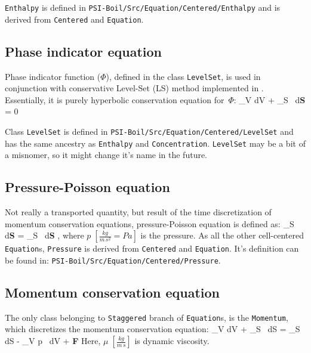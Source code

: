 {\tt Enthalpy} is defined in {\tt PSI-Boil/Src/Equation/Centered/Enthalpy}
and is derived from {\tt Centered} and {\tt Equation}.

\subsection{Phase indicator equation}

Phase indicator function ($\Phi$), defined in the class {\tt LevelSet}, is used
in conjunction with conservative Level-Set (LS) method implemented in
{\psiboil}. Essentially, it is purely hyperbolic conservation equation for~$\Phi$:
%
\be
         \int_V  dV
       + \int_S \uvw \Phi \, d{\bf S}
       = 
       0
       \; \; \; \;
       [\frac{m^3}{s}]
\ee

Class {\tt LevelSet} is defined in {\tt PSI-Boil/Src/Equation/Centered/LevelSet}
and has the same ancestry as {\tt Enthalpy} and {\tt Concentration}. {\tt LevelSet}
may be a bit of a misnomer, so it might change it's name in the future.

\subsection{Pressure-Poisson equation}

Not really a transported quantity, but result of the time discretization of
momentum conservation equations, pressure-Poisson equation is defined as:
%
\be
         \int_S  \, d{\bf S} 
       =  \int_S \uvw \, d{\bf S}
       \; \; \; \; 
       [ \frac{m^3}{s^2} ],
  \label{eq_pressure}
\ee
% 
where $p \; [\frac{kg}{m \, s^2} = Pa]$ is the pressure. As all the other
cell-centered {\tt Equation}s, {\tt Pressure} is derived from {\tt Centered}
and {\tt Equation}. It's definition can be found in:
{\tt PSI-Boil/Src/Equation/Centered/Pressure}.

\subsection{Momentum conservation equation}

The only class belonging to {\tt Staggered} branch of {\tt Equation}s,
is the {\tt Momentum}, which discretizes the momentum conservation 
equation:
%
\be
         \int_V  dV
       + \int_S \rho \uvw \uvw \, dS
       = \int_S \mu \nabla \uvw \, dS
       - \int_V \nabla p \, dV
       + {\bf F}
       \; \; \; \;
       [\frac{kg \, m}{s^2} = N]
  \label{eq_momentum}
\ee
%
Here, $\mu \; [\frac{kg}{m \, s}]$ is dynamic viscosity. 

